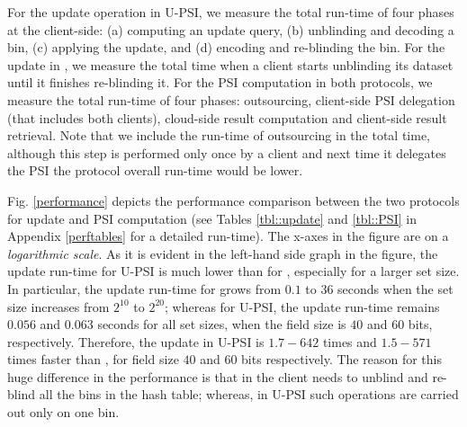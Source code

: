 For the update operation in U-PSI, we measure the total run-time of four phases at the client-side: (a) computing an update query, (b) unblinding and decoding a bin, (c) applying the update, and (d) encoding and re-blinding the bin. For the update in \cite{eopsi}, we measure the total time when a client starts unblinding its dataset until it finishes re-blinding it. For the PSI computation in both protocols, we measure the total run-time of four phases: outsourcing, client-side PSI delegation (that includes both clients), cloud-side result computation and client-side result retrieval. Note that we include the run-time of outsourcing in the total time, although this step is performed only once by a client and  next time it delegates the PSI the protocol overall run-time would be lower. 

Fig. \ref{performance} depicts the  performance comparison between the two protocols  for update and PSI computation (see Tables \ref{tbl::update} and \ref{tbl::PSI}  in Appendix \ref{perftables} for a detailed run-time). The x-axes  in the figure are on a \emph{logarithmic scale}. As it is evident in the left-hand side graph in the figure, the update run-time for U-PSI is much lower than for \cite{eopsi}, especially for a larger set size. In particular, the update run-time for \cite{eopsi} grows from  $0.1$ to $36$ seconds when the set size increases from $2^{\scriptscriptstyle 10}$ to $2^{\scriptscriptstyle 20}$; whereas for U-PSI, the update run-time remains $0.056$ and $0.063$ seconds for all set sizes, when the field size is $40$ and $60$ bits, respectively. Therefore, the update in U-PSI is $1.7-642$ times and $1.5-571$ times faster than \cite{eopsi}, for field size $40$ and $60$ bits respectively.  The reason for this huge difference in the performance is that in \cite{eopsi} the client needs to unblind and re-blind all the bins in the hash table; whereas, in U-PSI such operations are carried out only on one bin. 
   

